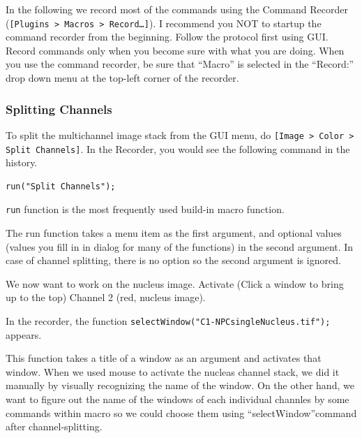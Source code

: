 \documentclass[11pt,a4paper,oneside]{report}
\newcommand{\ijmenu}[1]{\texttt{\small#1}}
\newcommand{\ilcom}[1]{\texttt{\small#1}}
\begin{document}
In the following we record most of the commands using the Command Recorder (\ijmenu{[Plugins > Macros > Record\ldots]}). I recommend you NOT to startup the command recorder from the beginning. Follow the protocol first using GUI. Record commands only when you become sure with what you are doing. When you use the command recorder, be sure that ``Macro'' is selected in the ``Record:'' drop down menu at the top-left corner of the recorder.

\subsubsection{Splitting Channels}

To split the multichannel image stack from the GUI menu, do \ilcom{[Image > Color > Split Channels]}. In the Recorder, you would see the following command in the history. 
\begin{lstlisting}[numbers=none]
run("Split Channels");
\end{lstlisting}

\ilcom{run} function is the most frequently used build-in macro function. 


The run function takes a menu item as the first argument, and optional values (values you fill in in dialog for many of the functions) in the second argument. In case of channel splitting, there is no option so the second argument is ignored. 

We now want to work on the nucleus image. Activate (Click a window to bring up to the top) Channel 2 (red, nucleus image).

In the recorder, the function \ilcom{selectWindow("C1-NPCsingleNucleus.tif");} appears. 


This function takes a title of a window as an argument and activates that window. When we used mouse to activate the nucleas channel stack, we did it manually by visually recognizing the name of the window. On the other hand, we want to figure out the name of the windows of each individual channles by some commands within macro so we could choose them using ``selectWindow''command after channel-splitting.  
\end{document}
